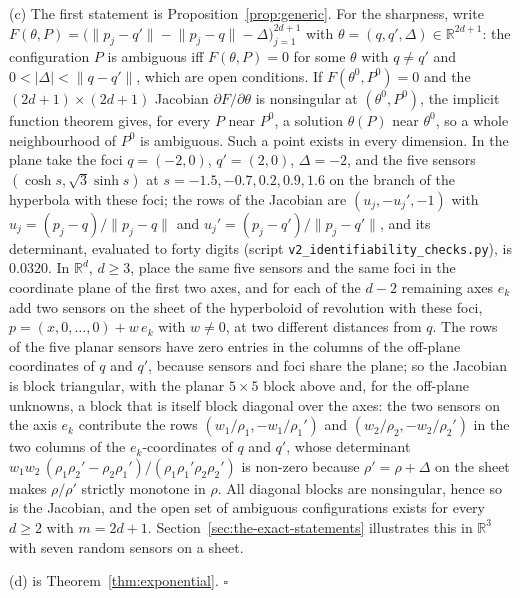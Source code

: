 \documentclass{article}
\begin{document}
(c) The first statement is Proposition~\ref{prop:generic}. For the sharpness, write $F(\theta, P) = \bigl(\lVert p_j - q' \rVert - \lVert p_j - q \rVert - \Delta\bigr)_{j=1}^{2d+1}$ with $\theta = (q, q', \Delta) \in \mathbb{R}^{2d+1}$: the configuration $P$ is ambiguous iff $F(\theta, P) = 0$ for some $\theta$ with $q \ne q'$ and $0 < |\Delta| < \lVert q - q' \rVert$, which are open conditions. If $F(\theta^{0}, P^{0}) = 0$ and the $(2d+1) \times (2d+1)$ Jacobian $\partial F/\partial\theta$ is nonsingular at $(\theta^{0}, P^{0})$, the implicit function theorem gives, for every $P$ near $P^{0}$, a solution $\theta(P)$ near $\theta^{0}$, so a whole neighbourhood of $P^{0}$ is ambiguous. Such a point exists in every dimension. In the plane take the foci $q = (-2, 0)$, $q' = (2, 0)$, $\Delta = -2$, and the five sensors $(\cosh s, \sqrt{3}\sinh s)$ at $s = -1.5, -0.7, 0.2, 0.9, 1.6$ on the branch of the hyperbola with these foci; the rows of the Jacobian are $(u_j, -u_j', -1)$ with $u_j = (p_j - q)/\lVert p_j - q \rVert$ and $u_j' = (p_j - q')/\lVert p_j - q' \rVert$, and its determinant, evaluated to forty digits (script \texttt{v2\_identifiability\_checks.py}), is $0.0320$. In $\mathbb{R}^{d}$, $d \ge 3$, place the same five sensors and the same foci in the coordinate plane of the first two axes, and for each of the $d - 2$ remaining axes $e_k$ add two sensors on the sheet of the hyperboloid of revolution with these foci, $p = (x, 0, \dots, 0) + w\, e_k$ with $w \ne 0$, at two different distances from $q$. The rows of the five planar sensors have zero entries in the columns of the off-plane coordinates of $q$ and $q'$, because sensors and foci share the plane; so the Jacobian is block triangular, with the planar $5 \times 5$ block above and, for the off-plane unknowns, a block that is itself block diagonal over the axes: the two sensors on the axis $e_k$ contribute the rows $(w_1/\rho_1, -w_1/\rho_1')$ and $(w_2/\rho_2, -w_2/\rho_2')$ in the two columns of the $e_k$-coordinates of $q$ and $q'$, whose determinant $w_1 w_2\,(\rho_1\rho_2' - \rho_2\rho_1')/(\rho_1\rho_1'\rho_2\rho_2')$ is non-zero because $\rho' = \rho + \Delta$ on the sheet makes $\rho/\rho'$ strictly monotone in $\rho$. All diagonal blocks are nonsingular, hence so is the Jacobian, and the open set of ambiguous configurations exists for every $d \ge 2$ with $m = 2d + 1$. Section~\ref{sec:the-exact-statements} illustrates this in $\mathbb{R}^{3}$ with seven random sensors on a sheet.

(d) is Theorem~\ref{thm:exponential}. $\square$
\end{document}
